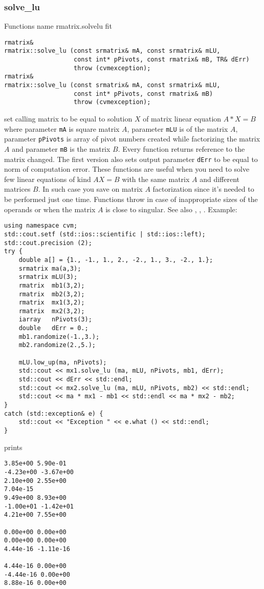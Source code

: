 \subsubsection{solve\_lu}
Functions%
\pdfdest name {rmatrix.solvelu} fit
\begin{verbatim}
rmatrix&
rmatrix::solve_lu (const srmatrix& mA, const srmatrix& mLU,
                   const int* pPivots, const rmatrix& mB, TR& dErr)
                   throw (cvmexception);
rmatrix&
rmatrix::solve_lu (const srmatrix& mA, const srmatrix& mLU,
                   const int* pPivots, const rmatrix& mB)
                   throw (cvmexception);
\end{verbatim}
set  calling matrix to be equal to  solution $X$ of 
matrix linear equation
$A*X=B$ where parameter \verb"mA" is square matrix $A$,
parameter \verb"mLU" is 
of the matrix $A$, parameter \verb"pPivots" is  array of pivot numbers
created while factorizing the matrix $A$
and  parameter \verb"mB" is the matrix $B$.
Every function returns  reference to the matrix changed.
The first version also sets output parameter \verb"dErr" to be equal
to  norm of computation error.
These functions are useful when you need to solve few linear equations
of kind $AX=B$ with the same matrix $A$ and different matrices $B$.
In such case you save on matrix $A$ factorization since it's needed to be
performed just one time.
Functions throw 
in case of inappropriate sizes
of the operands or when the matrix $A$ is close to singular.
See also
,
,
.
Example:
\begin{Verbatim}
using namespace cvm;
std::cout.setf (std::ios::scientific | std::ios::left);
std::cout.precision (2);
try {
    double a[] = {1., -1., 1., 2., -2., 1., 3., -2., 1.};
    srmatrix ma(a,3);
    srmatrix mLU(3);
    rmatrix  mb1(3,2);
    rmatrix  mb2(3,2);
    rmatrix  mx1(3,2);
    rmatrix  mx2(3,2);
    iarray   nPivots(3);
    double   dErr = 0.;
    mb1.randomize(-1.,3.);
    mb2.randomize(2.,5.);

    mLU.low_up(ma, nPivots);
    std::cout << mx1.solve_lu (ma, mLU, nPivots, mb1, dErr);
    std::cout << dErr << std::endl;
    std::cout << mx2.solve_lu (ma, mLU, nPivots, mb2) << std::endl;
    std::cout << ma * mx1 - mb1 << std::endl << ma * mx2 - mb2;
}
catch (std::exception& e) {
    std::cout << "Exception " << e.what () << std::endl;
}
\end{Verbatim}
prints
\begin{Verbatim}
3.85e+00 5.90e-01
-4.23e+00 -3.67e+00
2.10e+00 2.55e+00
7.04e-15
9.49e+00 8.93e+00
-1.00e+01 -1.42e+01
4.21e+00 7.55e+00

0.00e+00 0.00e+00
0.00e+00 0.00e+00
4.44e-16 -1.11e-16

4.44e-16 0.00e+00
-4.44e-16 0.00e+00
8.88e-16 0.00e+00
\end{Verbatim}
\newpage




